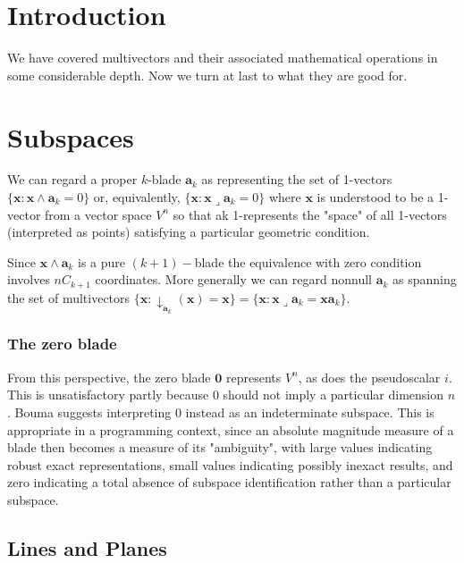 \documentclass[a4paper]{book}
\numberwithin{equation}{chapter}
\begin{document}
    \section{Introduction}

     We have covered multivectors and their associated mathematical operations in some considerable depth. Now we turn at last to what they are good for. 

    \section{Subspaces}

We can regard a proper $k$-blade $\mathbf{a}_k$ as representing the set of 1-vectors 
$\{ \mathbf{x} : \mathbf{x}\wedge\mathbf{a}_k = 0 \}$ or, equivalently, 
$\{ \mathbf{x} : \mathbf{x}\lrcorner\mathbf{a}_k = 0 \}$ where $\mathbf{x}$
is understood to be a 1-vector from a vector space $V^n$ 
so that ak 1-represents the "space" of all 1-vectors (interpreted as points) satisfying a 
particular geometric condition.

\vspace{\baselineskip}

Since $\mathbf{x}\wedge\mathbf{a}_k$ is a pure $(k+1)-$blade the equivalence with 
zero condition involves $nC_{k+1}$ coordinates. More generally we can regard 
nonnull $\mathbf{a}_k$ as spanning the set of multivectors 
$\{ \mathbf{x} : \downarrow_{\mathbf{a}_k}(\mathbf{x})=\mathbf{x} \} = \{ \mathbf{x} : 
\mathbf{x}\lrcorner \mathbf{a}_k=\mathbf{x}\mathbf{a}_k \}$. 

\subsubsection{The zero blade}

From this perspective, the zero blade $\mathbf{0}$ represents $V^n$, 
as does the pseudoscalar $i$. This is unsatisfactory partly because 0 should not 
imply a particular dimension $n$. Bouma \cite{bouma2001} suggests interpreting 0 
instead as an indeterminate subspace. This is appropriate in a 
programming context, since an absolute magnitude measure of a blade 
then becomes a measure of its "ambiguity", with large values 
indicating robust exact representations, small values indicating 
possibly inexact results, and zero indicating a total absence of 
subspace identification rather than a particular subspace. 

\subsection{Lines and Planes}
\end{document}

